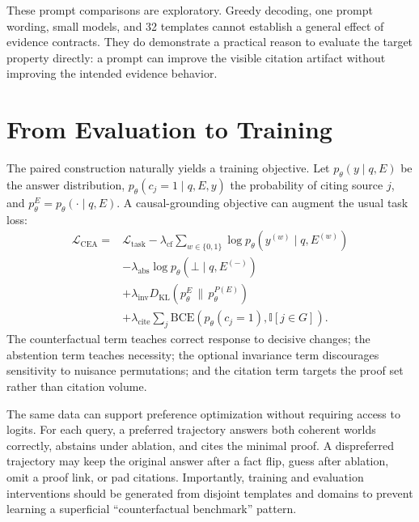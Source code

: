 \documentclass[10pt,twocolumn]{article}
\newcommand{\ind}{\mathbb{I}}
\newcommand{\botans}{\bot}
\begin{document}
These prompt comparisons are exploratory. Greedy decoding, one prompt wording, small models, and 32 templates cannot establish a general effect of evidence contracts. They do demonstrate a practical reason to evaluate the target property directly: a prompt can improve the visible citation artifact without improving the intended evidence behavior.

\section{From Evaluation to Training}

The paired construction naturally yields a training objective. Let $p_\theta(y\mid q,E)$ be the answer distribution, $p_\theta(c_j=1\mid q,E,y)$ the probability of citing source $j$, and $p_\theta^E=p_\theta(\cdot\mid q,E)$. A causal-grounding objective can augment the usual task loss:
\begin{align}
\mathcal{L}_{\mathrm{CEA}} ={}& \mathcal{L}_{\mathrm{task}}
-\lambda_{\mathrm{cf}}\sum_{w\in\{0,1\}}\log p_\theta(y^{(w)}\mid q,E^{(w)})\nonumber\\
&-\lambda_{\mathrm{abs}}\log p_\theta(\botans\mid q,E^{(-)})\nonumber\\
&+\lambda_{\mathrm{inv}}D_{\mathrm{KL}}\!\left(p_\theta^E\,\|\,p_\theta^{P(E)}\right)\nonumber\\
&+\lambda_{\mathrm{cite}}\sum_j \mathrm{BCE}\!\left(p_\theta(c_j=1),\ind[j\in G]\right).
\end{align}
The counterfactual term teaches correct response to decisive changes; the abstention term teaches necessity; the optional invariance term discourages sensitivity to nuisance permutations; and the citation term targets the proof set rather than citation volume.

The same data can support preference optimization without requiring access to logits. For each query, a preferred trajectory answers both coherent worlds correctly, abstains under ablation, and cites the minimal proof. A dispreferred trajectory may keep the original answer after a fact flip, guess after ablation, omit a proof link, or pad citations. Importantly, training and evaluation interventions should be generated from disjoint templates and domains to prevent learning a superficial ``counterfactual benchmark'' pattern.
\end{document}
